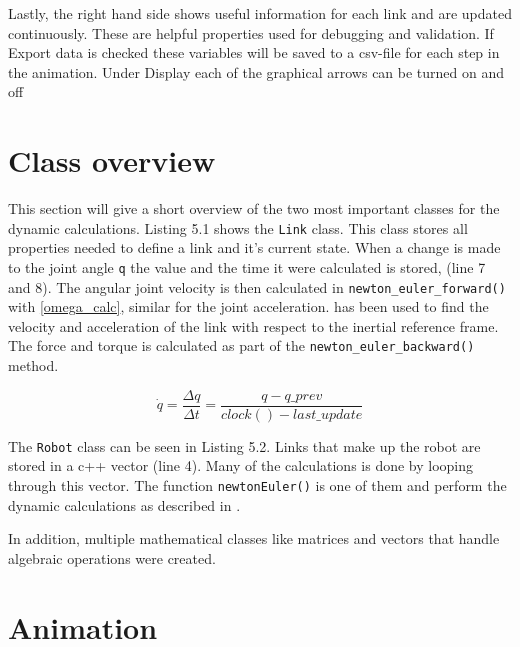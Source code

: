 Lastly, the right hand side shows useful information for each link and are updated continuously. These are helpful properties used for debugging and validation. If \textsf{Export data} is checked these variables will be saved to a csv-file for each step in the animation. Under \textsf{Display} each of the graphical arrows can be turned on and off

\section{Class overview}

This section will give a short overview of the two most important classes for the dynamic calculations. Listing 5.1 shows the \texttt{Link} class. This class stores all properties needed to define a link and it's current state. When a change is made to the joint angle \texttt{q} the value and the time it were calculated is stored, (line 7 and 8). The angular joint velocity is then calculated in \texttt{newton\_euler\_forward()} with \eqref{omega_calc}, similar for the joint acceleration.  has been used to find the velocity and acceleration of the link with respect to the inertial reference frame. The force and torque is calculated as part of the \texttt{newton\_euler\_backward()} method.

\label{Link}

\begin{equation}\label{omega_calc}
\dot{q} = \frac{\Delta q}{\Delta t}=\frac{q-q\_prev}{clock()-last\_update}
\end{equation}

\label{Robot}

The \texttt{Robot} class can be seen in Listing 5.2. Links that make up the robot are stored in a c++ vector (line 4). Many of the calculations is done by looping through this vector. The function \texttt{newtonEuler()} is one of them and perform the dynamic calculations as described in .

In addition, multiple mathematical classes like matrices and vectors that handle algebraic operations were created.

\section{Animation}

